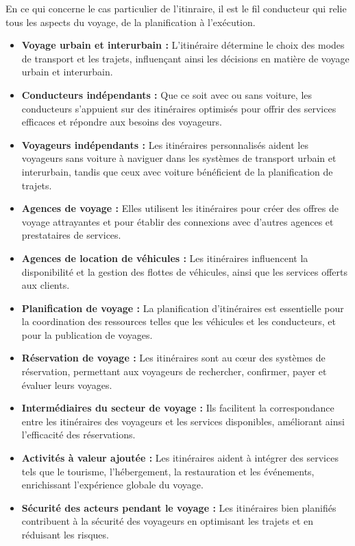 En ce qui concerne le cas particulier de l'itinraire, il est le fil conducteur qui relie tous les aspects du voyage, de la planification à l’exécution.
\begin{itemize}
    \item \textbf{Voyage urbain et interurbain :} L’itinéraire détermine le choix des modes de transport et les trajets, influençant ainsi les décisions en matière de voyage urbain et interurbain.
    \item \textbf{Conducteurs indépendants :} Que ce soit avec ou sans voiture, les conducteurs s’appuient sur des itinéraires optimisés pour offrir des services efficaces et répondre aux besoins des voyageurs.
    \item \textbf{Voyageurs indépendants :} Les itinéraires personnalisés aident les voyageurs sans voiture à naviguer dans les systèmes de transport urbain et interurbain, tandis que ceux avec voiture bénéficient de la planification de trajets.
    \item \textbf{Agences de voyage :} Elles utilisent les itinéraires pour créer des offres de voyage attrayantes et pour établir des connexions avec d’autres agences et prestataires de services.
    \item \textbf{Agences de location de véhicules :} Les itinéraires influencent la disponibilité et la gestion des flottes de véhicules, ainsi que les services offerts aux clients.
    \item \textbf{Planification de voyage :} La planification d’itinéraires est essentielle pour la coordination des ressources telles que les véhicules et les conducteurs, et pour la publication de voyages.
    \item \textbf{Réservation de voyage :} Les itinéraires sont au cœur des systèmes de réservation, permettant aux voyageurs de rechercher, confirmer, payer et évaluer leurs voyages.
    \item \textbf{Intermédiaires du secteur de voyage :} Ils facilitent la correspondance entre les itinéraires des voyageurs et les services disponibles, améliorant ainsi l’efficacité des réservations.
    \item \textbf{Activités à valeur ajoutée :} Les itinéraires aident à intégrer des services tels que le tourisme, l’hébergement, la restauration et les événements, enrichissant l’expérience globale du voyage.
    \item \textbf{Sécurité des acteurs pendant le voyage :} Les itinéraires bien planifiés contribuent à la sécurité des voyageurs en optimisant les trajets et en réduisant les risques.
\end{itemize}